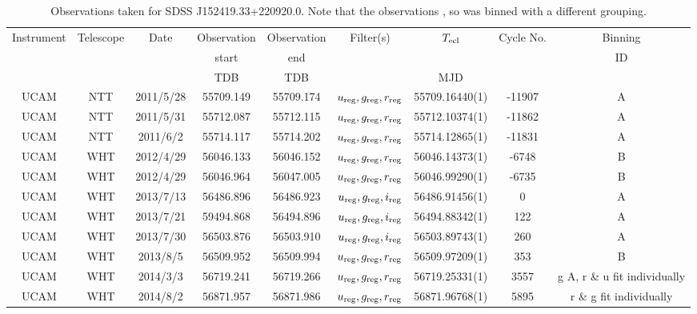 \begin{table}
	\begin{center}
		\caption{Observations taken for SDSS J152419.33+220920.0. Note that the observations , so was binned with a different grouping.}
		\label{table:observing:observation logs SDSS J152419.33+220920.0}
		\begin{tabular}{ccccccccc}
			\hline
			Instrument & Telescope & Date & Observation  & Observation  & Filter(s) & $T_{\rm ecl}$ & Cycle No. & Binning \\
			 &  &  &  start &  end &  &  &  & ID \\
			 &  &  & TDB & TDB &  & MJD &  &  \\
			\hline
			\hline
			UCAM & NTT & 2011/5/28  & 55709.149 & 55709.174 & $u_{\rm reg},g_{\rm reg},r_{\rm reg}$ & 55709.16440(1) & -11907 & A \\
			UCAM & NTT & 2011/5/31  & 55712.087 & 55712.115 & $u_{\rm reg},g_{\rm reg},r_{\rm reg}$ & 55712.10374(1) & -11862 & A \\
			UCAM & NTT & 2011/6/2   & 55714.117 & 55714.202 & $u_{\rm reg},g_{\rm reg},r_{\rm reg}$ & 55714.12865(1) & -11831 & A \\
			UCAM & WHT & 2012/4/29  & 56046.133 & 56046.152 & $u_{\rm reg},g_{\rm reg},r_{\rm reg}$ & 56046.14373(1) & -6748  & B \\
			UCAM & WHT & 2012/4/29  & 56046.964 & 56047.005 & $u_{\rm reg},g_{\rm reg},r_{\rm reg}$ & 56046.99290(1) & -6735  & B \\
			UCAM & WHT & 2013/7/13  & 56486.896 & 56486.923 & $u_{\rm reg},g_{\rm reg},i_{\rm reg}$ & 56486.91456(1) & 0      & A \\
			UCAM & WHT & 2013/7/21  & 59494.868 & 56494.896 & $u_{\rm reg},g_{\rm reg},i_{\rm reg}$ & 56494.88342(1) & 122    & A \\
			UCAM & WHT & 2013/7/30  & 56503.876 & 56503.910 & $u_{\rm reg},g_{\rm reg},i_{\rm reg}$ & 56503.89743(1) & 260    & A \\
			UCAM & WHT & 2013/8/5   & 56509.952 & 56509.994 & $u_{\rm reg},g_{\rm reg},r_{\rm reg}$ & 56509.97209(1) & 353    & B \\
			UCAM & WHT & 2014/3/3   & 56719.241 & 56719.266 & $u_{\rm reg},g_{\rm reg},r_{\rm reg}$ & 56719.25331(1) & 3557   & g A, r \& u fit individually \\
			UCAM & WHT & 2014/8/2   & 56871.957 & 56871.986 & $u_{\rm reg},g_{\rm reg},r_{\rm reg}$ & 56871.96768(1) & 5895   & r \& g fit individually \\
		   \hline
		\end{tabular}
	\end{center}
\end{table}